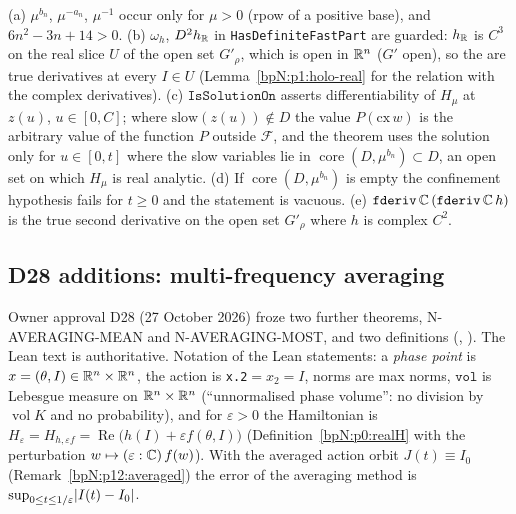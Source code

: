 \begin{remark}\label{bpN:p0:partial-totality}
(a) $\mu^{b_n}$, $\mu^{-a_n}$, $\mu^{-1}$ occur only for $\mu>0$ (rpow of a positive base), and $6n^2-3n+14>0$. (b) $\omega_h$, $D^2h_{\mathbb{R}}$ in \texttt{HasDefiniteFastPart} are guarded: $h_{\mathbb{R}}$ is $C^3$ on the real slice $U$ of the open set $G'_\rho$, which is open in $\mathbb{R}^n$ ($G'$ open), so the  are true derivatives at every $I\in U$ (Lemma~\ref{bpN:p1:holo-real} for the relation with the complex derivatives). (c) $\texttt{IsSolutionOn}$ asserts differentiability of $H_\mu$ at $z(u)$, $u\in[0,C]$; where $\mathrm{slow}(z(u))\notin D$ the value $P(\mathrm{cx}\,w)$ is the arbitrary value of the function $P$ outside $\mathcal F$, and the theorem uses the solution only for $u\in[0,t]$ where the slow variables lie in $\operatorname{core}(D,\mu^{b_n})\subset D$, an open set on which $H_\mu$ is real analytic. (d) If $\operatorname{core}(D,\mu^{b_n})$ is empty the confinement hypothesis fails for $t\ge0$ and the statement is vacuous. (e) $\texttt{fderiv}\,\mathbb{C}\,(\texttt{fderiv}\,\mathbb{C}\,h)$ is the true second derivative on the open set $G'_\rho$ where $h$ is complex $C^2$.
\end{remark}

\subsection{D28 additions: multi-frequency averaging}\label{bpN:p0:avg-sec}

Owner approval D28 (27 October 2026) froze two further theorems, N-AVERAGING-MEAN and N-AVERAGING-MOST, and two definitions
(\texttt{},
\texttt{}).
The Lean text is authoritative. Notation of the Lean statements: a \emph{phase point} is $x=(\theta,I)\in\mathbb{R}^n\times\mathbb{R}^n$, the action is
\texttt{x.2}$=x_2=I$, norms are max norms, $\texttt{vol}$ is Lebesgue measure on $\mathbb{R}^n\times\mathbb{R}^n$ (``unnormalised phase volume'': no
division by $\operatorname{vol}K$ and no probability), and for $\varepsilon>0$ the Hamiltonian is
$H_\varepsilon=H_{h,\varepsilon f}=\operatorname{Re}\bigl(h(I)+\varepsilon f(\theta,I)\bigr)$ (Definition~\ref{bpN:p0:realH} with the perturbation
$w\mapsto(\varepsilon:\mathbb{C})\,f(w)$). With the averaged action orbit $J(t)\equiv I_0$ (Remark~\ref{bpN:p12:averaged}) the error
of the averaging method is $\sup_{0\le t\le1/\varepsilon}\lvert I(t)-I_0\rvert$.


